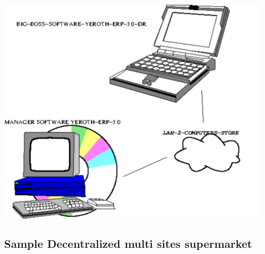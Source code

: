 \begin{center}
\includegraphics[scale=0.7]{images/yeroth-erp-sample-2-computers-store.pdf}
\label{fig:sample-two-computers-store}
\end{center}

\newpage

\subsection{Sample Decentralized multi sites supermarket}

